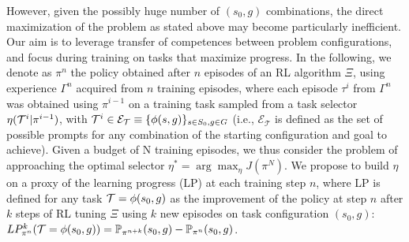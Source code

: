 However, given the possibly huge number of $(s_0,g)$ combinations, the direct maximization of the problem as stated above may become particularly inefficient. %
Our aim is to leverage transfer of competences between problem configurations, and focus during training on tasks that maximize progress. In the following, we denote as $\pi^n$   %
the policy obtained after $n$ episodes of an RL algorithm $\Xi$, using experience $\Gamma^{n}$ acquired from $n$ training episodes, where each episode $\tau^i$ from $\Gamma^{n}$ was obtained using $\pi^{i-1}$ on a training task sampled from a task selector %
$\eta({\cal T}^i|\pi^{i-1})$, with ${\cal T}^i \in \mathcal{E}_\mathcal{T} \equiv \{\phi(s,g)\}_{s \in S_0, g\in G}$ (i.e., $\mathcal{E}_\mathcal{T}$ is defined as the set of possible prompts for any combination of the starting configuration and goal to achieve). %
Given a budget of N training episodes, we thus consider the problem of approaching the optimal selector $\eta^* = \arg\max_\eta J(\pi^N)$. We propose to build $\eta$ on a proxy of the learning progress (LP) at each training step $n$, where LP is defined for any task ${\cal T}=\phi(s_0,g)$ as the improvement of the policy at step $n$ after $k$ steps of RL tuning  $\Xi$ using %
$k$ new episodes on task configuration $(s_0,g)$:  $LP^k_{\pi^n}({\cal T}=\phi(s_0,g))=\mathbb{P}_{\pi^{n+k}}(s_0,g) - \mathbb{P}_{\pi^{n}}(s_0,g)$. %





